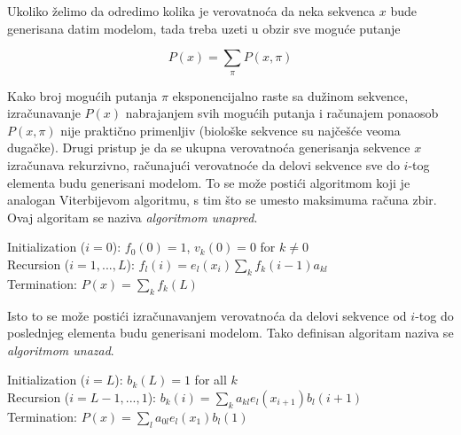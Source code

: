 \documentclass[a4paper, 12pt]{article}
\begin{document}
Ukoliko želimo da odredimo kolika je verovatnoća da neka sekvenca $x$ bude generisana datim modelom, tada treba uzeti u obzir sve moguće putanje

$$P(x) = \sum_{\pi}P(x, \pi)$$

\noindent Kako broj mogućih putanja $\pi$ eksponencijalno raste sa dužinom sekvence, izračunavanje $P(x)$ nabrajanjem svih mogućih putanja i računajem ponaosob $P(x, \pi)$ nije praktično primenljiv (biološke sekvence su najčešće veoma dugačke). Drugi pristup je da se ukupna verovatnoća generisanja sekvence $x$ izračunava rekurzivno, računajući verovatnoće da delovi sekvence sve do $i$-tog elementa budu generisani modelom. To se može postići algoritmom koji je analogan Viterbijevom algoritmu, s tim što se umesto maksimuma računa zbir. Ovaj algoritam se naziva \textit{algoritmom unapred}.

\begin{algorithm}[h!] 
 \vspace*{0.2cm}
 Initialization ($i=0$): \hspace{0.3cm} $f_0(0) = 1$, $v_k(0) = 0$ for $k \neq 0$ \\
 \vspace*{0.2cm}
 Recursion ($i=1, ..., L$): \hspace{0.05cm}$f_l(i) = e_l(x_i)\sum_k f_k(i-1)a_{kl}$ \\
 \vspace*{0.2cm}
 Termination: \hspace{1.8cm} $P(x) = \sum_k f_k(L)$ \\
\end{algorithm}

\noindent Isto to se može postići izračunavanjem verovatnoća da delovi sekvence od $i$-tog do poslednjeg elementa budu generisani modelom. Tako definisan algoritam naziva se \textit{algoritmom unazad}.

\begin{algorithm}[h!] 
 \vspace*{0.2cm}
 Initialization ($i=L$): \hspace{1cm} $b_k(L) = 1$ for all $k$ \\
 \vspace*{0.2cm}
 Recursion ($i=L-1, ..., 1$): \hspace{0.05cm}$b_k(i) = \sum_k a_{kl}e_l(x_{i+1})b_l(i+1)$ \\
 \vspace*{0.2cm}
 Termination: \hspace{2.5cm} $P(x) = \sum_l a_{0l}e_l(x_1)b_l(1)$ \\
\end{algorithm}
\end{document}
